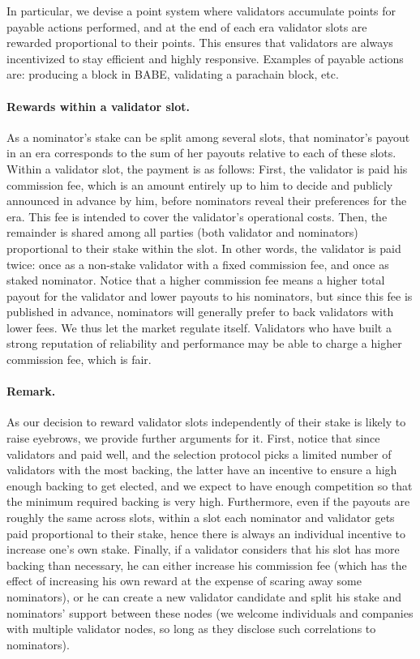 In particular, we devise a point system where validators accumulate points for payable actions performed, 
and at the end of each era validator slots are rewarded proportional to their points. 
This ensures that validators are always incentivized to stay efficient and highly responsive.
Examples of payable actions are: producing a block in BABE, validating a parachain block, etc.

\paragraph{Rewards within a validator slot.} As a nominator's stake can be split among several slots, 
that nominator's payout in an era corresponds to the sum of her payouts relative to each of these slots. 
Within a validator slot, the payment is as follows: 
First, the validator is paid his commission fee, which is an amount entirely up to him to decide and 
publicly announced in advance by him, before nominators reveal their preferences for the era. 
This fee is intended to cover the validator's operational costs. 
Then, the remainder is shared among all parties (both validator and nominators) proportional to their stake within the slot. 
In other words, the validator is paid twice: once as a non-stake validator with a fixed commission fee, and once as staked nominator. 
Notice that a higher commission fee means a higher total payout for the validator and lower payouts to his nominators, 
but since this fee is published in advance, nominators will generally prefer to back validators with lower fees. 
We thus let the market regulate itself. Validators who have built a strong reputation of reliability and performance 
may be able to charge a higher commission fee, which is fair.

\paragraph{Remark.} As our decision to reward validator slots independently of their stake is likely to raise eyebrows, 
we provide further arguments for it. 
First, notice that since validators and paid well, and the selection protocol picks a limited number of validators 
with the most backing, the latter have an incentive to ensure a high enough backing to get elected, 
and we expect to have enough competition so that the minimum required backing is very high. 
Furthermore, even if the payouts are roughly the same across slots, within a slot each nominator and validator 
gets paid proportional to their stake, hence there is always an individual incentive to increase one's own stake. 
Finally, if a validator considers that his slot has more backing than necessary, he can either increase his 
commission fee (which has the effect of increasing his own reward at the expense of scaring away some nominators),
or he can create a new validator candidate and split his stake and nominators' support between these nodes
(we welcome individuals and companies with multiple validator nodes, so long as they disclose such correlations to nominators).

